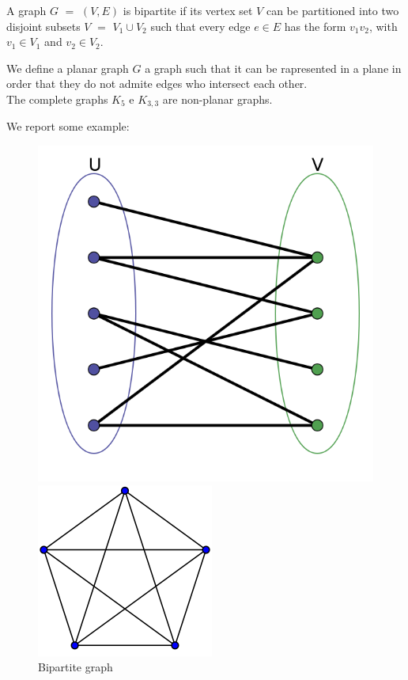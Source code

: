\begin{definition}
A graph $G$ $=$ $(V,E)$ is bipartite if its vertex set $V$ can be partitioned into two disjoint subsets $V$ $=$ $V_{1} \cup V_{2}$ such that every edge $e \in E$ has the form $v_{1}v_{2}$, with $v_{1} \in V_{1}$ and $v_{2} \in V_{2}$.
\end{definition}

\begin{definition}
We define a planar graph $G$ a graph such that it can be rapresented  in a plane in order that they do not admite edges who intersect each other.\\
The complete graphs $K_{5}$ e $K_{3,3}$ are non-planar graphs.
\end{definition}
We report some example:

\begin{figure}[htbp]
\begin{minipage}[htbp]{.50\textwidth}
\centering
\includegraphics[width=.60\textwidth]{bipartito.png}
\caption{Bipartite graph}
\end{minipage}
\begin{minipage}[htbp]{.50\textwidth}
\centering
\includegraphics[width=.60\textwidth]{K5.png}

\end{minipage}
\end{figure}
